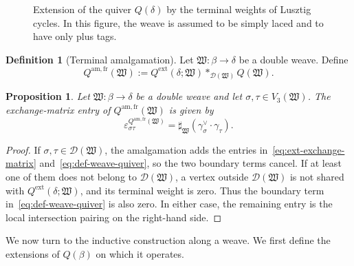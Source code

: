 \documentclass[10pt,a4paper]{article}
\newtheorem{proposition}[theorem]{Proposition}
\theoremstyle{definition}
\newtheorem{definition}[theorem]{Definition}
\theoremstyle{remark}
\newcommand{\Dcal}{\mathcal D}
\newcommand{\eps}{\varepsilon}
\newcommand{\fW}{\mathfrak W}
\begin{document}
\begin{figure}[htbp]
 \centering
 
 \caption{Extension of the quiver \(Q(\delta)\) by the terminal weights of
 Lusztig cycles.  In this figure, the weave is assumed to be simply laced and
 to have only plus tags.}
 \label{fig:lusztig-boundary-arrow-general}
\end{figure}

\begin{definition}[Terminal amalgamation]
\label{def:frozen-quiver-amalgamation}
Let \(\fW:\beta\to\delta\) be a double weave.  Define
\[
 Q^{\mathrm{am,fr}}(\fW)
 :=Q^{\mathrm{ext}}(\delta;\fW)
       \ast_{\Dcal(\fW)}Q(\fW).
\]
\end{definition}

\begin{proposition}
\label{prop:double-amalgamation-exchange-matrix}
Let \(\fW:\beta\to\delta\) be a double weave and let
\(\sigma,\tau\in V_3(\fW)\).  The exchange-matrix entry of
\(Q^{\mathrm{am,fr}}(\fW)\) is given by
\begin{equation}
 \eps^{Q^{\mathrm{am,fr}}(\fW)}_{\sigma\tau}
 =\sharp_\fW(\gamma_\sigma^\vee\mathbin{\cdot}\gamma_\tau).
 \label{eq:double-am-contraction-contraction}
\end{equation}
\end{proposition}

\begin{proof}
If \(\sigma,\tau\in\Dcal(\fW)\), the amalgamation adds the entries
in~\eqref{eq:ext-exchange-matrix} and~\eqref{eq:def-weave-quiver}, so the two
boundary terms cancel.  If at least one of them does not belong to
\(\Dcal(\fW)\), a vertex outside \(\Dcal(\fW)\) is not shared with
\(Q^{\mathrm{ext}}(\delta;\fW)\), and its terminal weight is zero.  Thus the
boundary term in~\eqref{eq:def-weave-quiver} is also zero.  In either case, the
remaining entry is the local intersection pairing on the right-hand side.
\end{proof}

We now turn to the inductive construction along a weave.  We first define the
extensions of \(Q(\beta)\) on which it operates.
\end{document}
